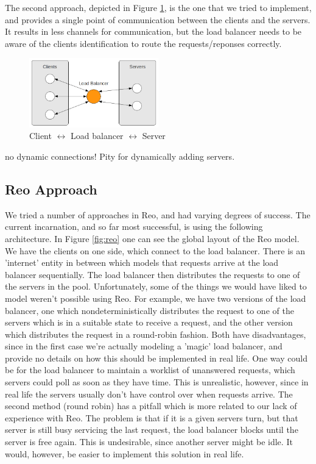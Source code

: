 \documentclass[a4paper]{article}
\newcommand{\re}{Reo\xspace}
\begin{document}
The second approach, depicted in Figure \ref{fig:clbs}, is the one that we
tried to implement, and provides a single point of communication between the
clients and the servers. It results in less channels for communication, but the
load balancer needs to be aware of the clients identification to route the
requests/reponses correctly.

\begin{figure}[htb]
	\begin{center}
		\includegraphics[width=0.5\textwidth]{images/c_lb_s.png}
	\end{center}
	\caption{Client $\leftrightarrow$ Load balancer  $\leftrightarrow$ Server }
	\label{fig:clbs}
\end{figure}


no dynamic connections! Pity for dynamically adding servers. 


\subsection{\re Approach}

We tried a number of approaches in \re, and had varying degrees of success. The
current incarnation, and so far most successful, is using the following
architecture. In Figure \ref{fig:reo} one can see the global layout of the \re
model. We have the clients on one side, which connect to the load balancer.
There is an 'internet' entity in between which models that requests arrive at
the load balancer sequentially. The load balancer then distributes the requests
to one of the servers in the pool. Unfortunately, some of the things we would
have liked to model weren't possible using \re. For example, we have two
versions of the load balancer, one which nondeterministically distributes the
request to one of the servers which is in a suitable state to receive a request,
and the other version which distributes the request in a round-robin fashion.
Both have disadvantages, since in the first case we're actually modeling a
'magic' load balancer, and provide no details on how this should be implemented
in real life. One way could be for the load balancer to maintain a worklist of
unanswered requests, which servers could poll as soon as they have time. This is
unrealistic, however, since in real life the servers usually don't have control
over when requests arrive. The second method (round robin) has a pitfall which
is more related to our lack of experience with \re. The problem is that if it is a
given servers turn, but that server is still busy servicing the last request,
the load balancer blocks until the server is free again. This is undesirable,
since another server might be idle. It would, however, be easier to implement
this solution in real life.
\end{document}
